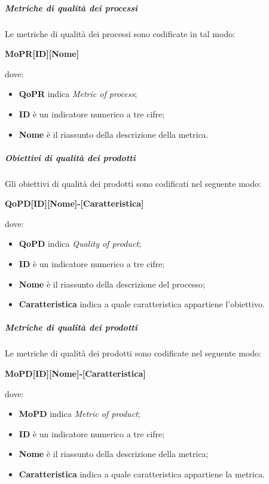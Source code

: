\documentclass[../norme-di-progetto.tex]{subfiles}
\begin{document}
\subparagraph*{Metriche di qualità dei processi}
Le metriche di qualità dei processi sono codificate in tal modo: \\
\begin{center}
  \centering
  \textbf{MoPR[ID][Nome]}
\end{center} dove:
\begin{itemize}
  \item \textbf{QoPR} indica \textit{Metric of process};
  \item \textbf{ID} è un indicatore numerico a tre cifre;
  \item \textbf{Nome} è il riassunto della descrizione della metrica.
\end{itemize}

\subparagraph*{Obiettivi di qualità dei prodotti}
Gli obiettivi di qualità dei prodotti sono codificati nel seguente modo: \\
\begin{center}
  \centering
  \textbf{QoPD[ID][Nome]-[Caratteristica]}
\end{center} dove:
\begin{itemize}
  \item \textbf{QoPD} indica \textit{Quality of product};
  \item \textbf{ID} è un indicatore numerico a tre cifre;
  \item \textbf{Nome} è il riassunto della descrizione del processo;
  \item \textbf{Caratteristica} indica a quale caratteristica appartiene l'obiettivo.
\end{itemize}

\subparagraph*{Metriche di qualità dei prodotti}
Le metriche di qualità dei prodotti sono codificate nel seguente modo:
\begin{center}
  \centering
  \textbf{MoPD[ID][Nome]-[Caratteristica]}
\end{center} dove:
\begin{itemize}
  \item \textbf{MoPD} indica \textit{Metric of product};
  \item \textbf{ID} è un indicatore numerico a tre cifre;
  \item \textbf{Nome} è il riassunto della descrizione della metrica;
  \item \textbf{Caratteristica} indica a quale caratteristica appartiene la metrica.
\end{itemize}

\end{document}
